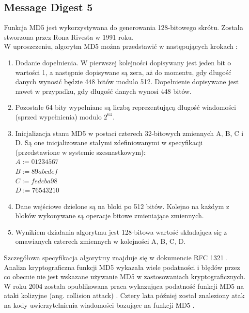 \subsection{Message Digest 5}
Funkcja MD5 jest wykorzystywana do generowania 128-bitowego skrótu. Została stworzona przez Rona Rivesta w 1991 roku. \\
W uproszczeniu, algorytm MD5 można przedstawić w następujących krokach \cite{crypto101}:
\begin{enumerate}
	\item Dodanie dopełnienia. W pierwszej kolejności dopisywany jest jeden bit o wartości 1, a następnie dopisywane są zera, aż do momentu, gdy długość danych wynosić będzie 448 bitów modulo 512. Dopełnienie dopisywane jest nawet w przypadku, gdy długość danych wynosi 448 bitów.
	\item Pozostałe 64 bity wypełniane są liczbą reprezentującą długość wiadomości (sprzed wypełnienia) modulo $2^{64}$. 
	\item Inicjalizacja stanu MD5 w postaci czterech 32-bitowych zmiennych A, B, C i D. Są one inicjalizowane stałymi zdefiniowanymi w specyfikacji (przedstawione w systemie szesnastkowym): \\
		$A := 01 23 45 67$ \\
		$B := 89 ab cd ef$ \\
		$C := fe dc ba 98$ \\
		$D := 76 54 32 10$ 
	\item Dane wejściowe dzielone są na bloki po 512 bitów. Kolejno na każdym z bloków wykonywane są operacje bitowe zmieniające zmiennych. 
	\item Wynikiem działania algorytmu jest 128-bitowa wartość składająca się z omawianych czterech zmiennych w kolejności A, B, C, D.
\end{enumerate} 
Szczegółowa specyfikacja algorytmy znajduje się w dokumencie RFC 1321 \cite{md5rfc}. \\
Analiza kryptograficzna funkcji MD5 wykazała wiele podatności i błędów przez co obecnie nie jest wskazane używanie MD5 w zastosowaniach kryptograficznych. 
W roku 2004 została opublikowana praca wykazująca podatność funkcji MD5 na ataki kolizyjne (ang. collision attack) \cite{md5cert}. Cztery lata później został znaleziony atak na kody uwierzytelnienia wiadomości bazujące na funkcji MD5 \cite{md5hmac}.

